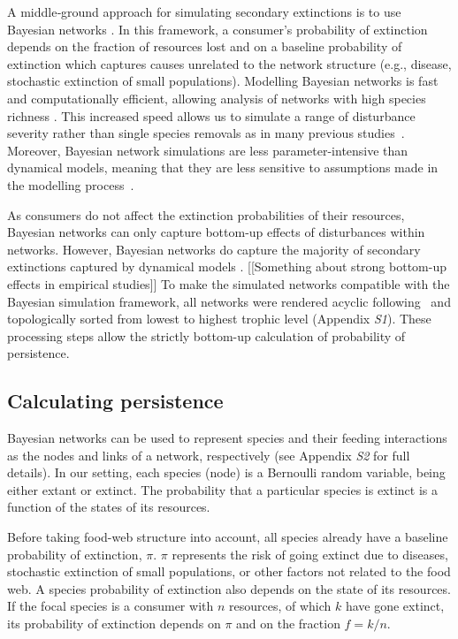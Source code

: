 \documentclass[12pt]{article}
\begin{document}
\begin{spacing}{2.0}
        
        A middle‐ground approach for simulating secondary extinctions is to use Bayesian networks \citep{Eklof2013}. 
        In this framework, a consumer's probability of extinction depends on the fraction of resources lost and on a baseline probability of extinction which captures causes unrelated to the network structure (e.g., disease, stochastic extinction of small populations).
        Modelling Bayesian networks is fast and computationally efficient, allowing analysis of networks with high species richness \citep{Haussler2020}. 
        This increased speed allows us to simulate a range of disturbance severity rather than single species removals as in many previous studies~\citep{}.
        Moreover, Bayesian network simulations are less parameter-intensive than dynamical models, meaning that they are less sensitive to assumptions made in the modelling process~\citep{}.
        
        As consumers do not affect the extinction probabilities of their resources, Bayesian networks can only capture bottom-up effects of disturbances within networks. 
        However, Bayesian networks do capture the majority of secondary extinctions captured by dynamical models \citep{Eklof2013}.
        [[Something about strong bottom-up effects in empirical studies]]
    	To make the simulated networks compatible with the Bayesian simulation framework, all networks were rendered acyclic following~\citet{Allesina2009functional} and topologically sorted from lowest to highest trophic level (Appendix \emph{S1}).
    	These processing steps allow the strictly bottom-up calculation of probability of persistence.
    	
		
	\subsection*{Calculating persistence}	
        Bayesian networks can be used to represent species and their feeding interactions as the nodes and links of a network, respectively (see Appendix \emph{S2} for full details).
        In our setting, each species (node) is a Bernoulli random variable, being either extant or extinct. 
        The probability that a particular species is extinct is a function of the states of its resources.
        
		Before taking food-web structure into account, all species already have a baseline probability of extinction, $\pi$. 
		$\pi$ represents the risk of going extinct due to diseases, stochastic extinction of small populations, or other factors not related to the food web.
		A species probability of extinction also depends on the state of its resources. 
        If the focal species is a consumer with $n$ resources, of which $k$ have gone extinct, its probability of extinction depends on $\pi$ and on the fraction $f = k/n$.
        

\end{spacing}
\end{document}
